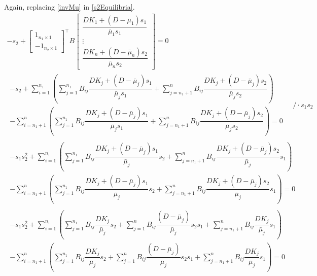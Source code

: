 \documentclass[3p,times]{elsarticle}
\begin{document}
Again, replacing \eqref{invMu} in \eqref{s2Equilibria}.
\begin{align}
-s_2+
\begin{bmatrix}
1_{n_1 \times 1}\\ - 1_{n_2 \times 1}
\end{bmatrix}^\top B\begin{bmatrix}
\dfrac{DK_1+(D-\bar{\mu}_1)s_1}{\bar{\mu}_{1}s_1} \\ \vdots \\ \dfrac{DK_n+(D-\bar{\mu}_n)s_2}{\bar{\mu}_{n}s_2} 
\end{bmatrix} = 0 \\
\begin{array}{c} \displaystyle  -s_2 + \sum \limits_{i=1}^{n_1}\left(\sum \limits_{j = 1}^{n_1} B_{ij}\dfrac{DK_j+(D-\bar{\mu}_j)s_1}{\bar{\mu}_{j}s_1} +\sum \limits_{j = n_1+1}^{n} B_{ij}\dfrac{DK_j+(D-\bar{\mu}_j)s_2}{\bar{\mu}_{j}s_2} \right) \\
\displaystyle - \sum \limits_{i=n_1+1}^{n}\left(\sum \limits_{j = 1}^{n_1} B_{ij}\dfrac{DK_j+(D-\bar{\mu}_j)s_1}{\bar{\mu}_{j}s_1} +\sum \limits_{j = n_1+1}^{n} B_{ij}\dfrac{DK_j+(D-\bar{\mu}_j)s_2}{\bar{\mu}_{j}s_2} \right)= 0
\end{array} \quad / \cdot s_1s_2 \\
\begin{array}{c} \displaystyle  -s_1s_2^2 +\sum \limits_{i=1}^{n_1}\left(\sum \limits_{j = 1}^{n_1} B_{ij}\dfrac{DK_j+(D-\bar{\mu}_j)s_1}{\bar{\mu}_{j}}s_2 +\sum \limits_{j = n_1+1}^{n} B_{ij}\dfrac{DK_j+(D-\bar{\mu}_j)s_2}{\bar{\mu}_{j}}s_1 \right) \\
\displaystyle -  \sum \limits_{i=n_1+1}^{n}\left(\sum \limits_{j = 1}^{n_1} B_{ij}\dfrac{DK_j+(D-\bar{\mu}_j)s_1}{\bar{\mu}_{j}}s_2 +\sum \limits_{j = n_1+1}^{n} B_{ij}\dfrac{DK_j+(D-\bar{\mu}_j)s_2}{\bar{\mu}_{j}}s_1 \right)= 0
\end{array} \\
\begin{array}{c} \displaystyle  -s_1s_2^2 + \sum \limits_{i=1}^{n_1}\left(\sum \limits_{j = 1}^{n_1} B_{ij}\dfrac{DK_j}{\bar{\mu}_{j}}s_2 +\sum \limits_{j = 1}^{n} B_{ij}\dfrac{(D-\bar{\mu}_j)}{\bar{\mu}_{j}}s_2s_1 + \sum \limits_{j = n_1+1}^{n} B_{ij}\dfrac{DK_j}{\bar{\mu}_{j}}s_1\right) \\
\displaystyle -  \sum \limits_{i=n_1+1}^{n}\left(\sum \limits_{j = 1}^{n_1} B_{ij}\dfrac{DK_j}{\bar{\mu}_{j}}s_2 +\sum \limits_{j = 1}^{n} B_{ij}\dfrac{(D-\bar{\mu}_j)}{\bar{\mu}_{j}}s_2s_1 + \sum \limits_{j = n_1+1}^{n} B_{ij}\dfrac{DK_j}{\bar{\mu}_{j}}s_1 \right)= 0

\end{array}
\end{align}
\end{document}
